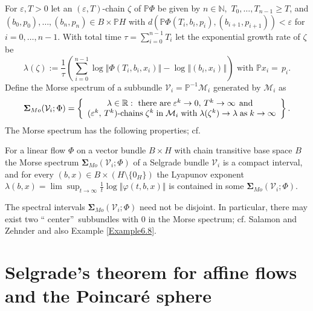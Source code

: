 	For $\varepsilon,T>0$ let an $(\varepsilon,T)$-chain $\zeta$ of $\mathbb{P}%
	\Phi$ be given by $n\in\mathbb{N}\mathbf{,}$ $T_{0},\ldots,T_{n-1}\geq T$, and
	$(b_{0},p_{0}),\ldots,(b_{n},p_{n})\in B\times\mathbb{P}H$ with $d(\mathbb{P}%
	\Phi(T_{i},b_{i},p_{i}),(b_{i+1},p_{i+1}))<\varepsilon$ for $i=0,\ldots,n-1$.
	With total time $\tau=\sum_{i=0}^{n-1}T_{i}$ let the exponential growth rate
	of $\zeta$ be
	\[
	\lambda(\zeta):=\frac{1}{\tau}\left(  \sum_{i=0}^{n-1}\log\left\Vert
	\Phi(T_{i},b_{i},x_{i})\right\Vert -\log\left\Vert (b_{i},x_{i})\right\Vert
	\right)  \mbox{ with }\mathbb{P}x_{i}=\,p_{i}.
	\]
	Define the Morse spectrum of a subbundle $\mathcal{V}_{i}=\mathbb{P}%
	^{-1}\mathcal{M}_{i}$ generated by $\mathcal{M}_{i}$ as
	\[
	\mathbf{\Sigma}_{Mo}(\mathcal{V}_{i};\Phi)=\left\{
	\begin{array}
		[c]{c}%
		\lambda\in\mathbb{R}:\mbox{\ there\ are}\;\varepsilon^{k}\rightarrow
		0,\,T^{k}\rightarrow\infty\;\,\mbox{and}\,\;\\
		(\varepsilon^{k},\,T^{k})\mbox{-chains}\mathrm{\;}\zeta^{k}%
		\;\mbox{in}\;\mathcal{M}_{i}\;\mbox{with}\mathrm{\;}\lambda(\zeta
		^{k})\rightarrow\lambda\;\mbox{as}\;k\rightarrow\infty
	\end{array}
	\right\}  .
	\]
	The Morse spectrum has the following properties; cf. \cite[Theorem 9.3.5 and
	Theorem 9.4.1]{ColK14}
	
	\begin{theorem}
		\label{Theorem_Morse}For a linear flow $\Phi$ on a vector bundle $B\times H$
		with chain transitive base space $B$ the Morse spectrum $\mathbf{\Sigma}%
		_{Mo}(\mathcal{V}_{i};\Phi)$ of a Selgrade bundle $\mathcal{V}_{i}$ is a
		compact interval, and for every $(b,x)\in B\times(H\setminus\{0_{H}\})$ the
		Lyapunov exponent $\lambda(b,x)=\lim\sup_{t\rightarrow\infty}\frac{1}{t}%
		\log\left\Vert \varphi(t,b,x)\right\Vert $ is contained in some
		$\mathbf{\Sigma}_{Mo}(\mathcal{V}_{i};\Phi)$.
	\end{theorem}
	
	The spectral intervals $\mathbf{\Sigma}_{Mo}(\mathcal{V}_{i};\Phi)$ need not
	be disjoint. In particular, there may exist two \textquotedblleft
	center\textquotedblright\ subbundles with $0$ in the Morse spectrum; cf.
	Salamon and Zehnder \cite[Example 2.14]{SalZ88} and also Example
	\ref{Example6.8}.
	
	\section{Selgrade's theorem for affine flows and the Poincar\'{e}
		sphere\label{Section3}}
	
